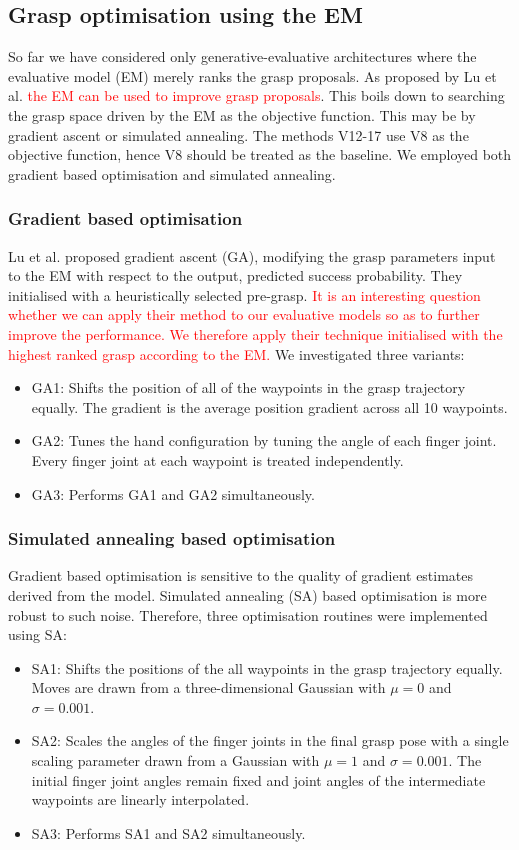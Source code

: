 \subsection{Grasp optimisation using the EM}
\noindent
So far we have considered only generative-evaluative architectures where the evaluative model (EM) merely ranks the grasp proposals. As proposed by Lu et al. \cite{lu2017planning} \textcolor{red}{the EM can be used to improve grasp proposals}. This boils down to searching the grasp space driven by the EM as the objective function. This may be by gradient ascent or simulated annealing. The methods V12-17 use V8 as the objective function, hence V8 should be treated as the baseline. We employed both gradient based optimisation and simulated annealing.

\subsubsection{Gradient based optimisation}
\noindent
Lu et al. \cite{lu2017planning} proposed gradient ascent (GA), modifying the grasp parameters input to the EM with respect to the output, predicted success probability. They initialised with a heuristically selected pre-grasp. \textcolor{red}{It is an interesting question whether we can apply their method to our evaluative models so as to further improve the performance. We therefore apply their technique initialised with the highest ranked grasp according to the EM.} We investigated three variants:
\begin{itemize}
\item GA1: Shifts the position of all of the waypoints in the grasp trajectory equally. The gradient is the average position gradient across all 10 waypoints.
\item GA2: Tunes the hand configuration by tuning the angle of each finger joint. Every finger joint at each waypoint is treated independently.
\item GA3: Performs GA1 and GA2 simultaneously.
\end{itemize}

\subsubsection{Simulated annealing based optimisation}
\noindent
Gradient based optimisation is sensitive to the quality of gradient estimates derived from the model. Simulated annealing (SA) based optimisation is more robust to such noise. Therefore, three optimisation routines were implemented using SA:
\begin{itemize}
\item SA1: Shifts the positions of the all waypoints in the grasp trajectory equally. Moves are drawn from a three-dimensional Gaussian with $\mu=0$ and $\sigma=0.001$. 
\item SA2: Scales the angles of the finger joints in the final grasp pose with a single scaling parameter drawn from a Gaussian with $\mu=1$ and $\sigma=0.001$. The initial finger joint angles remain fixed and joint angles of the intermediate waypoints are linearly interpolated. 
\item SA3: Performs SA1 and SA2 simultaneously.
\end{itemize}
